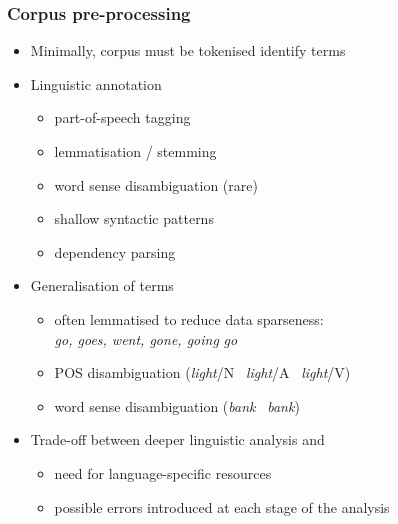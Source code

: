 \documentclass[t]{beamer} %
\begin{document}
\begin{frame}
  \frametitle{Corpus pre-processing}

  \ungap
  \begin{itemize}
  \item Minimally, corpus must be tokenised \so identify terms
  \item Linguistic annotation
    \begin{itemize}
    \item part-of-speech tagging
    \item lemmatisation / stemming
    \item word sense disambiguation (rare)
    \item shallow syntactic patterns
    \item dependency parsing
    \end{itemize}
    \pause
  \item Generalisation of terms
    \begin{itemize}
    \item often lemmatised to reduce data sparseness:\\
      \emph{go, goes, went, gone, going} \so \emph{go}
    \item POS disambiguation (\emph{light}/N \vs\ \emph{light}/A \vs\ \emph{light}/V)
    \item word sense disambiguation (\emph{bank} \vs\ \emph{bank})
    \end{itemize}
  \pause
  \item Trade-off between deeper linguistic analysis and
    \begin{itemize}
    \item need for language-specific resources
    \item possible errors introduced at each stage of the analysis
    \end{itemize}
  \end{itemize}
\end{frame}
\end{document}
